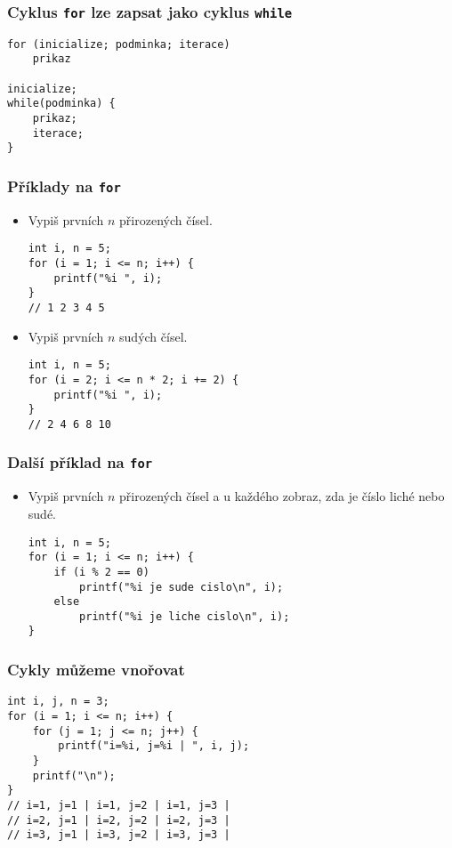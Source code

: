 \documentclass{beamer}
\newenvironment{itemizex}%
  {\large \begin{itemize}%
    \setlength{\itemsep}{8pt}%
    \setlength{\parskip}{8pt}}%
  {\end{itemize}}
\begin{document}
\begin{frame}[t,fragile]\frametitle{Cyklus \texttt{for} lze zapsat jako cyklus \texttt{while}} 
\begin{verbatim} 
for (inicialize; podminka; iterace)
    prikaz

inicialize;
while(podminka) {
    prikaz;
    iterace;
}
\end{verbatim}
\end{frame}


\begin{frame}[t,fragile]\frametitle{Příklady na \texttt{for}}
  \begin{itemize}
    \item Vypiš prvních $n$ přirozených čísel.
\begin{verbatim} 
int i, n = 5;
for (i = 1; i <= n; i++) {
    printf("%i ", i);
}
// 1 2 3 4 5
\end{verbatim}
  \item Vypiš prvních $n$ sudých čísel.
\begin{verbatim} 
int i, n = 5;
for (i = 2; i <= n * 2; i += 2) {
    printf("%i ", i);
}
// 2 4 6 8 10
\end{verbatim}
  \end{itemize}
\end{frame}



\begin{frame}[t,fragile]\frametitle{Další příklad na \texttt{for}} 
\begin{itemizex}
  \item Vypiš prvních $n$ přirozených čísel a u každého zobraz, zda je číslo liché nebo sudé.
\begin{verbatim} 
int i, n = 5;
for (i = 1; i <= n; i++) {
    if (i % 2 == 0)
        printf("%i je sude cislo\n", i);
    else
        printf("%i je liche cislo\n", i);
}
\end{verbatim}
\end{itemizex}
\end{frame}


\begin{frame}[t,fragile]\frametitle{Cykly můžeme vnořovat} 
\begin{verbatim} 
int i, j, n = 3;
for (i = 1; i <= n; i++) {
    for (j = 1; j <= n; j++) {
        printf("i=%i, j=%i | ", i, j);
    }
    printf("\n");
}
// i=1, j=1 | i=1, j=2 | i=1, j=3 | 
// i=2, j=1 | i=2, j=2 | i=2, j=3 | 
// i=3, j=1 | i=3, j=2 | i=3, j=3 |
\end{verbatim}
\end{frame}
\end{document}
